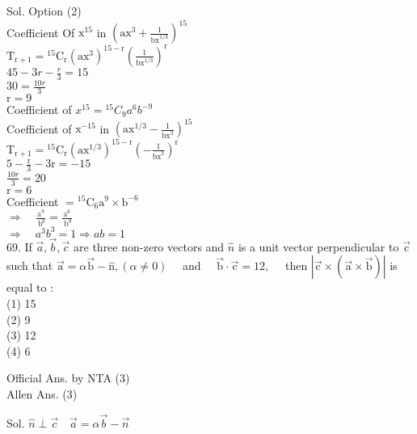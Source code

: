 \documentclass[10pt]{article}
\begin{document}
Sol. Option (2)\\
Coefficient Of \(\mathrm{x}^{15}\) in \(\left(\mathrm{ax}^{3}+\frac{1}{\mathrm{bx}^{1 / 3}}\right)^{15}\)\\
\(\mathrm{T}_{\mathrm{r}+1}={ }^{15} \mathrm{C}_{\mathrm{r}}\left(\mathrm{ax}^{3}\right)^{15-\mathrm{r}}\left(\frac{1}{\mathrm{bx}^{1 / 3}}\right)^{\mathrm{r}}\)\\
\(45-3 r-\frac{r}{3}=15\)\\
\(30=\frac{10 r}{3}\)\\
\(\mathrm{r}=9\)\\
Coefficient of \(x^{15}={ }^{15} C_{9} a^{6} b^{-9}\)\\
Coefficient of \(\mathrm{x}^{-15}\) in \(\left(\mathrm{ax}^{1 / 3}-\frac{1}{\mathrm{bx}^{3}}\right)^{15}\)\\
\(\mathrm{T}_{\mathrm{r}+1}={ }^{15} \mathrm{C}_{\mathrm{r}}\left(\mathrm{ax}^{1 / 3}\right)^{15-\mathrm{r}}\left(-\frac{1}{\mathrm{bx}^{3}}\right)^{\mathrm{r}}\)\\
\(5-\frac{\mathrm{r}}{3}-3 \mathrm{r}=-15\)\\
\(\frac{10 r}{3}=20\)\\
\(\mathrm{r}=6\)\\
Coefficient \(={ }^{15} \mathrm{C}_{6} \mathrm{a}^{9} \times \mathrm{b}^{-6}\)\\
\(\Rightarrow \quad \frac{\mathrm{a}^{9}}{\mathrm{~b}^{6}}=\frac{\mathrm{a}^{6}}{\mathrm{~b}^{9}}\)\\
\(\Rightarrow \quad a^{3} b^{3}=1 \Rightarrow a b=1\)\\
69. If \(\vec{a}, \vec{b}, \vec{c}\) are three non-zero vectors and \(\hat{n}\) is a unit vector perpendicular to \(\overrightarrow{\mathrm{c}}\) such that \(\overrightarrow{\mathrm{a}}=\alpha \overrightarrow{\mathrm{b}}-\hat{\mathrm{n}},(\alpha \neq 0) \quad\) and \(\quad \overrightarrow{\mathrm{b}} \cdot \overrightarrow{\mathrm{c}}=12, \quad\) then \(|\overrightarrow{\mathrm{c}} \times(\overrightarrow{\mathrm{a}} \times \overrightarrow{\mathrm{b}})|\) is equal to :\\
(1) 15\\
(2) 9\\
(3) 12\\
(4) 6

Official Ans. by NTA (3)\\
Allen Ans. (3)

Sol. \(\hat{n} \perp \vec{c} \quad \vec{a}=\alpha \vec{b}-\vec{n}\)
\end{document}
